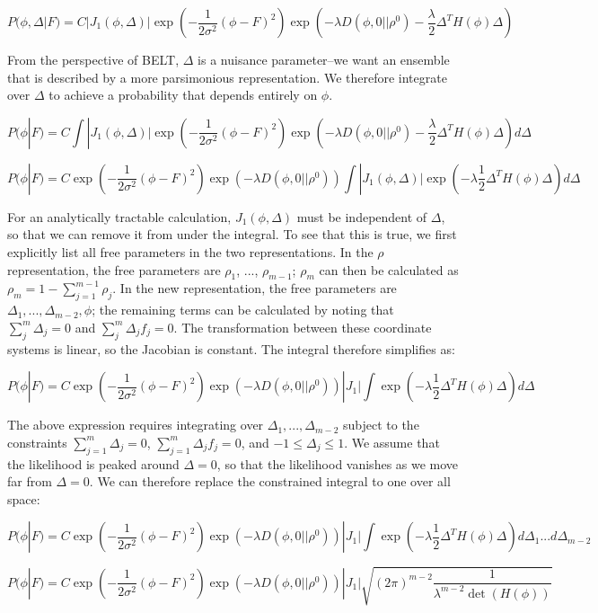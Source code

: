 \documentclass[12pt]{article}
\begin{document}
$$P(\phi, \Delta | F) = C |J_1(\phi, \Delta)| \exp(-\frac{1}{2\sigma^2} (\phi - F)^2) \exp(-\lambda  D(\phi, 0|| \rho^0) - \frac{\lambda}{2} \Delta^T H(\phi) \Delta)$$

From the perspective of BELT, $\Delta$ is a nuisance parameter--we want an ensemble that is described by a more parsimonious representation.  We therefore integrate over $\Delta$ to achieve a probability that depends entirely on $\phi$.  

$$P(\phi | F) = C \int |J_1(\phi, \Delta)| \exp(-\frac{1}{2\sigma^2} (\phi - F)^2) \exp(-\lambda  D(\phi, 0|| \rho^0) - \frac{\lambda}{2} \Delta^T H(\phi) \Delta) d\Delta $$

$$P(\phi | F) = C \exp(-\frac{1}{2\sigma^2} (\phi - F)^2) \exp(-\lambda  D(\phi, 0|| \rho^0))  \int |J_1(\phi, \Delta)|  \exp(-\lambda \frac{1}{2} \Delta^T H(\phi) \Delta) d\Delta $$

For an analytically tractable calculation, $J_1(\phi, \Delta)$ must be independent of $\Delta$, so that we can remove it from under the integral.  To see that this is true, we first explicitly list all free parameters in the two representations.  In the $\rho$ representation, the free parameters are $\rho_1$, ..., $\rho_{m-1}$; $\rho_m$ can then be calculated as $\rho_m = 1 - \sum_{j=1}^{m-1} \rho_j$.  In the new representation, the free parameters are $\Delta_1, ..., \Delta_{m-2}, \phi$; the remaining terms can be calculated by noting that $\sum_j^m \Delta_j = 0$ and $\sum_j^m \Delta_j f_j = 0$.  The transformation between these coordinate systems is linear, so the Jacobian is constant.  The integral therefore simplifies as:

$$P(\phi | F) = C \exp(-\frac{1}{2\sigma^2} (\phi - F)^2) \exp(-\lambda  D(\phi, 0|| \rho^0)) |J_1|  \int   \exp(-\lambda \frac{1}{2} \Delta^T H(\phi) \Delta) d\Delta $$

The above expression requires integrating over $\Delta_1, ..., \Delta_{m-2}$ subject to the constraints $\sum_{j=1}^m \Delta_j = 0$, $\sum_{j=1}^{m} \Delta_j f_j = 0$, and $-1 \le \Delta_j \le 1$.  We assume that the likelihood is peaked around $\Delta=0$, so that the likelihood vanishes as we move far from $\Delta = 0$.  We can therefore replace the constrained integral to one over all space:

$$P(\phi | F) = C \exp(-\frac{1}{2\sigma^2} (\phi - F)^2) \exp(-\lambda  D(\phi, 0|| \rho^0)) |J_1|  \int   \exp(-\lambda \frac{1}{2} \Delta^T H(\phi) \Delta) d\Delta_1 ... d\Delta_{m-2}$$


$$P(\phi | F) = C \exp(-\frac{1}{2\sigma^2} (\phi - F)^2) \exp(-\lambda  D(\phi, 0|| \rho^0)) |J_1|  \sqrt{(2\pi)^{m-2} \frac{1}{\lambda^{m-2} \det (H(\phi))}}  $$
\end{document}
